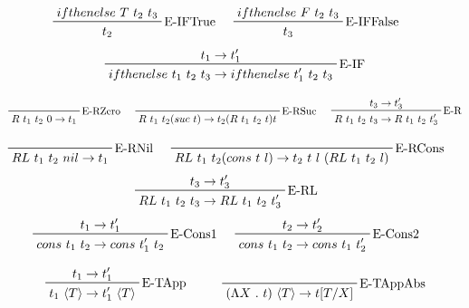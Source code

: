 \documentclass[12pt, titlepage, a4paper]{article}
\begin{document}
\begin{displaymath}
    \prftree[r]{E-IFTrue}{ifthenelse \ T \ t_2 \ t_3}{t_2} \hspace{0.5cm}
    \prftree[r]{E-IFFalse}{ifthenelse \ F \ t_2 \ t_3}{t_3} \hspace{0.5cm}
\end{displaymath}
\begin{displaymath}
    \prftree[r]{E-IF}{t_1 \rightarrow t_1'}{ifthenelse \ t_1 \ t_2 \ t_3 \rightarrow ifthenelse \ t_1' \ t_2 \ t_3}
\end{displaymath}

\begin{displaymath}
    \prftree[r]{E-RZero}{R \ t_1 \ t_2 \ 0 \rightarrow t_1} \hspace{0.5cm}
    \prftree[r]{E-RSuc}{R \ t_1 \ t_2 (suc \ t) \rightarrow t_2 (R \ t_1 \ t_2 \ t) t} \hspace{0.5cm}
    \prftree[r]{E-R}{t_3 \rightarrow t_3'}{R \ t_1 \ t_2 \ t_3 \rightarrow R \ t_1 \ t_2 \ t_3'}
\end{displaymath}


\begin{displaymath}
    \prftree[r]{E-RNil}{RL \ t_1 \ t_2 \ nil \rightarrow t_1} \hspace{0.5cm}
    \prftree[r]{E-RCons}{RL \ t_1 \ t_2 (cons \ t \ l) \rightarrow t_2 \ t \ l \ (RL \ t_1 \ t_2 \ l)} \hspace{0.5cm}
\end{displaymath}
\begin{displaymath}
    \prftree[r]{E-RL}{t_3 \rightarrow t_3'}{RL \ t_1 \ t_2 \ t_3 \rightarrow RL \ t_1 \ t_2 \ t_3'} \hspace{0.5cm}
\end{displaymath}
\begin{displaymath}
  \prftree[r]{E-Cons1}{t_1 \rightarrow t_1'}{cons \ t_1 \ t_2 \rightarrow cons \ t_1' \ t_2} \hspace{0.5cm}
  \prftree[r]{E-Cons2}{t_2 \rightarrow t_2'}{cons \ t_1 \ t_2 \rightarrow cons \ t_1 \ t_2'} \hspace{0.5cm}
\end{displaymath}


\begin{displaymath}
    \prftree[r]{E-TApp}{t_1 \rightarrow t_1'}{t_1 \ \langle T \rangle \rightarrow t_1' \ \langle T \rangle} \hspace{1cm}
    \prftree[r]{E-TAppAbs}{(\Lambda X \ . \ t)\ \langle T \rangle \rightarrow t[T/X]}
\end{displaymath}
\end{document}
